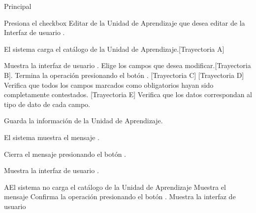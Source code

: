 \begin{UCtrayectoria}{Principal}

    \UCpaso[\UCactor] Presiona el checkbox Editar de la Unidad de Aprendizaje que desea editar de la Interfaz de usuario  .

    \UCpaso El sistema carga el catálogo de la Unidad de Aprendizaje.[Trayectoria A]


    \UCpaso Muestra la interfaz de usuario .
    \UCpaso[\UCactor] Elige los campos que desea modificar.[Trayectoria B].
    \UCpaso[\UCactor] Termina la operación presionando el botón . [Trayectoria C] [Trayectoria D]
    \UCpaso Verifica que todos los campos marcados como obligatorios hayan sido completamente contestados. [Trayectoria E]
    \UCpaso Verifica que los datos correspondan al tipo de dato de cada campo.

    \UCpaso Guarda la información de la Unidad de Aprendizaje.

    \UCpaso El sistema muestra el mensaje .

    \UCpaso[\UCactor] Cierra el mensaje presionando el botón .

    \UCpaso Muestra la interfaz de usuario .
\end{UCtrayectoria}


\begin{UCtrayectoriaA}{A}{El sistema no carga el catálogo de la Unidad de Aprendizaje}
	\UCpaso Muestra el mensaje 
	\UCpaso[\UCactor] Confirma la operación presionando el botón .
	 \UCpaso Muestra la interfaz de usuario 

\end{UCtrayectoriaA}


